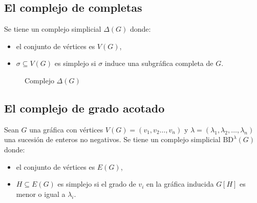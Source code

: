 \documentclass[final]{beamer}
\begin{document}
\begin{frame}[t]
\begin{multicols}{3}
\subsection{El complejo de completas}

Se tiene un complejo simplicial \(\Delta(G)\) donde:
\begin{itemize}
\item el conjunto de vértices es \(V(G)\),
\item \(\sigma\subseteq V(G)\) es simplejo si \(\sigma\) induce una
subgráfica completa de \(G\).
\end{itemize}

\begin{figure}[htbp]
\centering
{}
\caption{Complejo \(\Delta(G)\) \label{complejo-g}}
\end{figure}

\subsection{El complejo de grado acotado}

Sean \(G\) una gráfica con vértices
\(V(G)=(v_{1},v_{2}\ldots,v_{n})\) y
\(\lambda=(\lambda_{1},\lambda_{2},\ldots,\lambda_{n})\) una
sucesión de enteros no negativos. Se tiene un complejo simplicial
\(\mathrm{BD}^{\lambda}(G)\) donde:
\begin{itemize}
\item el conjunto de vértices es \(E(G)\),
\item \(H\subseteq E(G)\) es simplejo si el grado de \(v_{i}\) en la
gráfica inducida \(G[H]\) es menor o igual a \(\lambda_{i}\).
\end{itemize}


\end{multicols}
\end{frame}
\end{document}
